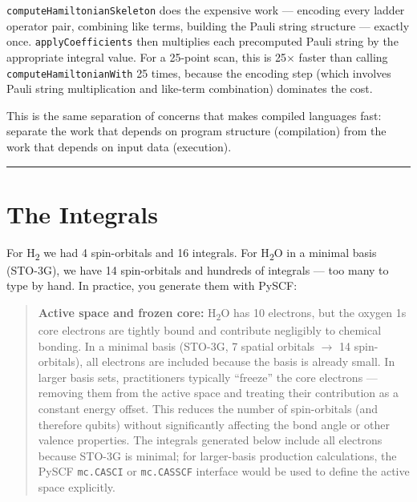 \documentclass[
  11pt,
  oneside]{book}
\begin{document}
\texttt{computeHamiltonianSkeleton} does the expensive work --- encoding
every ladder operator pair, combining like terms, building the Pauli
string structure --- exactly once. \texttt{applyCoefficients} then
multiplies each precomputed Pauli string by the appropriate integral
value. For a 25-point scan, this is 25$\times$ faster than calling
\texttt{computeHamiltonianWith} 25 times, because the encoding step
(which involves Pauli string multiplication and like-term combination)
dominates the cost.

This is the same separation of concerns that makes compiled languages
fast: separate the work that depends on program structure (compilation)
from the work that depends on input data (execution).

\begin{center}\rule{0.5\linewidth}{0.5pt}\end{center}

\section{The Integrals}\label{the-integrals}

For H\textsubscript{2} we had 4 spin-orbitals and 16 integrals. For H\textsubscript{2}O in a minimal
basis (STO-3G), we have 14 spin-orbitals and hundreds of integrals ---
too many to type by hand. In practice, you generate them with PySCF:

\begin{quote}
\textbf{Active space and frozen core:} H\textsubscript{2}O has 10 electrons, but the
oxygen 1s core electrons are tightly bound and contribute negligibly to
chemical bonding. In a minimal basis (STO-3G, 7 spatial orbitals $\rightarrow$ 14
spin-orbitals), all electrons are included because the basis is already
small. In larger basis sets, practitioners typically ``freeze'' the core
electrons --- removing them from the active space and treating their
contribution as a constant energy offset. This reduces the number of
spin-orbitals (and therefore qubits) without significantly affecting the
bond angle or other valence properties. The integrals generated below
include all electrons because STO-3G is minimal; for larger-basis
production calculations, the PySCF \texttt{mc.CASCI} or
\texttt{mc.CASSCF} interface would be used to define the active space
explicitly.
\end{quote}
\end{document}
